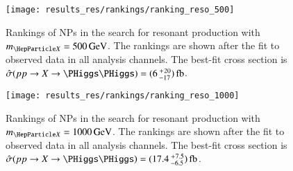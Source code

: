 \begin{figure}[htbp]
  \centering

  \texttt{[image: results\_res/rankings/ranking\_reso\_500]}

  \caption[Rankings of NPs in the search for resonant \HH production with
  $\mX = \SI{500}{\GeV}$.]{Rankings of NPs in the search for resonant \HH
    production with $\mX = \SI{500}{\GeV}$. The rankings are shown after the fit
    to observed data in all analysis channels. The best-fit cross section is
    $\hat{\sigma}(\pp \to X \to \HH) =
    (\num{6}\valuesep^{\hspace{0.25pt}+\hspace{0.25pt}20}_{-17})\valuesep\si{\femto\barn}$.}%
  \label{fig:ranking_pulls_mx500}
\end{figure}


\begin{figure}[htbp]
  \centering

  \texttt{[image: results\_res/rankings/ranking\_reso\_1000]}

  \caption[Rankings of NPs in the search for resonant \HH production with
  $\mX = \SI{1000}{\GeV}$.]{Rankings of NPs in the search for resonant \HH
    production with $\mX = \SI{1000}{\GeV}$. The rankings are shown after the
    fit to observed data in all analysis channels. The best-fit cross section is
    $\hat{\sigma}(\pp \to X \to \HH) =
    (\num{17.4}\valuesep^{\hspace{0.25pt}+\hspace{0.25pt}7.5}_{-6.5})\valuesep\si{\femto\barn}$.}%
  \label{fig:ranking_pulls_mx1000}
\end{figure}


